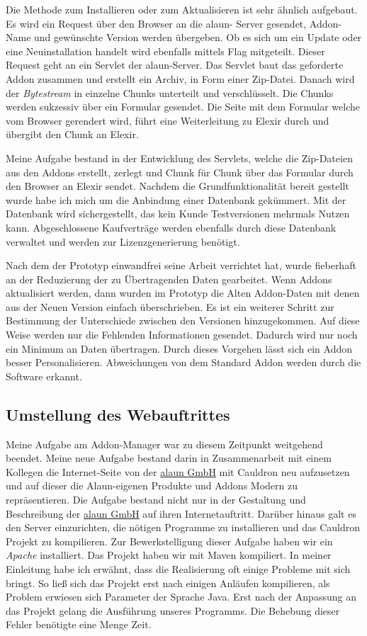 \documentclass[12pt]{article}
\begin{document}
Die Methode zum Installieren oder zum Aktualisieren ist sehr ähnlich aufgebaut. Es wird ein Request über den Browser an die alaun- Server gesendet, Addon-Name
und gewünschte Version werden übergeben. Ob es sich um ein Update oder eine Neuinstallation handelt wird ebenfalls mittels Flag mitgeteilt.
Dieser Request geht an ein Servlet der alaun-Server. Das Servlet baut das geforderte Addon zusammen und erstellt ein Archiv,
in Form einer Zip-Datei. Danach wird
der \textit{Bytestream} in einzelne Chunks unterteilt und verschlüsselt. Die Chunks werden sukzessiv über ein Formular gesendet. Die Seite mit dem Formular welche vom Browser gerendert wird, führt eine Weiterleitung zu Elexir durch und übergibt den Chunk an Elexir.

Meine Aufgabe bestand in der Entwicklung des Servlets, welche die Zip-Dateien aus den Addons erstellt, zerlegt und Chunk für Chunk über das Formular durch den Browser an Elexir sendet.
Nachdem die Grundfunktionalität bereit gestellt wurde habe ich mich um die Anbindung einer Datenbank gekümmert. Mit der Datenbank wird sichergestellt,
das kein Kunde Testversionen mehrmals Nutzen kann. Abgeschlossene Kaufverträge werden ebenfalls durch diese Datenbank verwaltet und werden zur
Lizenzgenerierung benötigt.

Nach dem der Prototyp einwandfrei seine Arbeit verrichtet hat, wurde fieberhaft an der Reduzierung der zu Übertragenden Daten gearbeitet.
Wenn Addons aktualisiert werden, dann wurden im Prototyp die Alten Addon-Daten mit denen aus der Neuen Version einfach überschrieben. 
Es ist ein weiterer Schritt zur Bestimmung der Unterschiede zwischen den Versionen hinzugekommen. Auf diese Weise werden nur die Fehlenden Informationen gesendet. Dadurch wird nur noch ein Minimum an Daten übertragen. Durch dieses Vorgehen
lässt sich ein Addon besser Personalisieren. Abweichungen von dem Standard Addon werden durch die Software erkannt.

\subsection{Umstellung des Webauftrittes}

Meine Aufgabe am Addon-Manager war zu diesem Zeitpunkt weitgehend beendet. Meine neue Aufgabe bestand darin in Zusammenarbeit mit einem Kollegen
die Internet-Seite von der \href{https://alaun.de/home/}{alaun GmbH} mit Cauldron neu aufzusetzen und auf dieser die Alaun-eigenen Produkte und Addons Modern zu repräsentieren.
Die Aufgabe bestand nicht nur in der Gestaltung und Beschreibung der \href{https://alaun.de/home/}{alaun GmbH} auf ihren Internetauftritt.
Darüber hinaus galt es den Server einzurichten, die nötigen Programme zu installieren und das Cauldron Projekt zu kompilieren.
Zur Bewerkstelligung dieser Aufgabe haben wir ein \textit{Apache} installiert. Das Projekt haben wir mit Maven kompiliert.
In meiner Einleitung habe ich erwähnt, dass die Realisierung oft einige Probleme mit sich bringt.
So ließ sich das Projekt erst nach einigen Anläufen kompilieren, als Problem erwiesen sich Parameter der Sprache Java.
Erst nach der Anpassung an das Projekt gelang die Ausführung unseres Programms. Die Behebung dieser Fehler benötigte eine
Menge Zeit. 
\end{document}
